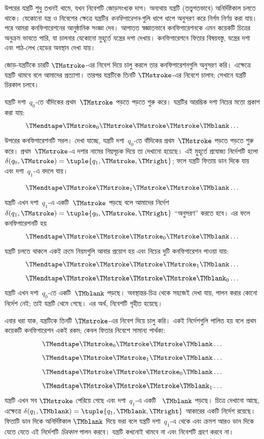 \documentclass[../../../include/open-logic-section]{subfiles}
\begin{document}
\begin{explain}
উপরের যন্ত্রটি শুধু তখনই থামে, যখন নিবেশটি জোড়সংখ্যক দাগ। অন্যথায়
যন্ত্রটি (তত্ত্বগতভাবে) অনির্দিষ্টকাল চলতে থাকে। যেকোনো যন্ত্র ও নিবেশের
ক্ষেত্রে যন্ত্রটির \emph{কনফিগারেশন}-গুলি ধাপে ধাপে অনুসরণ করে নির্গম
নির্ণয় করা যায়। পরে আমরা কনফিগারেশনের আনুষ্ঠানিক সংজ্ঞা দেব। আপাতত
স্বজ্ঞাতভাবে কনফিগারেশনকে এমন কয়েকটি চিত্রের অনুক্রম ভাবতে পারি, যা
চালনার যেকোনো মুহূর্তে যন্ত্রের দশা দেখায়। কনফিগারেশনে ফিতার বিষয়বস্তু,
যন্ত্রের দশা এবং পাঠ-লেখ হেডের অবস্থান দেখা যায়।

জোড়-যন্ত্রটিকে চারটি $\TMstroke$-এর নিবেশ দিয়ে চালু করলে তার
কনফিগারেশনগুলি অনুসরণ করি। এক্ষেত্রে যন্ত্রটি থামবে বলে আমাদের প্রত্যাশা।
তারপর যন্ত্রটিকে তিনটি $\TMstroke$-এর নিবেশে চালাব; সেখানে যন্ত্রটি
চিরকাল চলবে।

যন্ত্রটি দশা~$q_0$-তে বাঁদিকের প্রথম~$\TMstroke$ পড়তে পড়তে শুরু করে।
যন্ত্রটির আরম্ভিক দশা নিচের মতো প্রকাশ করা যায়:
\[
\TMendtape \TMstroke_0 \TMstroke \TMstroke \TMstroke \TMblank \ldots
\]
উপরের কনফিগারেশনটি সরল। দেখা যাচ্ছে, যন্ত্রটি দশা~$q_0$-তে বাঁদিকের
প্রথম~$\TMstroke$ পড়তে পড়তে শুরু করে। প্রথম~$\TMstroke$-এ দশার নামের
নিম্নসূচক দিয়ে তা দেখানো হয়েছে। এই মুহূর্তে প্রযোজ্য নির্দেশটি হলো
$\delta(q_0, \TMstroke) = \tuple{q_1, \TMstroke, \TMright}$; ফলে
যন্ত্রটি ফিতায় ডান দিকে যায় এবং দশা~$q_1$-এ বদলে যায়।

\[
\TMendtape \TMstroke \TMstroke_1 \TMstroke \TMstroke \TMblank \ldots
\]
যন্ত্রটি এখন দশা~$q_1$-এ একটি~$\TMstroke$ পড়ছে বলে আমাদের নির্দেশ
$\delta(q_1, \TMstroke) = \tuple{q_0, \TMstroke, \TMright}$ “অনুসরণ”
করতে হবে। এর ফলে কনফিগারেশনটি হয়
\[
\TMendtape \TMstroke \TMstroke \TMstroke_0 \TMstroke \TMblank \ldots
\]
যন্ত্রটি চলতে থাকলে একই ক্রমে নিয়মগুলি আবার প্রয়োগ হয় এবং নিচের দুটি
কনফিগারেশন পাওয়া যায়:
\[
\TMendtape \TMstroke \TMstroke \TMstroke \TMstroke_1 \TMblank \ldots
\]
\[
\TMendtape \TMstroke \TMstroke \TMstroke \TMstroke \TMblank_0 \ldots
\]
যন্ত্রটি এখন দশা~$q_0$-তে একটি~$\TMblank$ পড়ছে। অবস্থান্তর-চিত্র থেকে
সহজেই দেখা যায়, পালন করার কোনো নির্দেশ নেই; তাই যন্ত্রটি থেমে গেছে। এর
অর্থ, নিবেশটি গৃহীত হয়েছে।

এবার ধরা যাক, যন্ত্রটিকে তিনটি $\TMstroke$-এর নিবেশ দিয়ে চালু করি। একই
নির্দেশগুলি পালিত হয় বলে প্রথম কয়েকটি কনফিগারেশন একই রকম; কেবল ফিতার
নিবেশে সামান্য পার্থক্য:
\[
\TMendtape \TMstroke_0 \TMstroke \TMstroke \TMblank \ldots
\]
\[
\TMendtape \TMstroke \TMstroke_1 \TMstroke \TMblank \ldots
\]
\[
\TMendtape \TMstroke \TMstroke \TMstroke_0 \TMblank \ldots
\]
\[
\TMendtape \TMstroke \TMstroke \TMstroke \TMblank_1 \ldots
\]
যন্ত্রটি এখন সব $\TMstroke$ পেরিয়ে গেছে এবং দশা~$q_1$-এ একটি
~$\TMblank$ পড়ছে। চিত্রে দেখানো আছে, এক্ষেত্রে
$\delta(q_1, \TMblank) =\tuple{q_1, \TMblank, \TMright}$ আকারের একটি
নির্দেশ রয়েছে। ফিতাটি ডান দিকে অনির্দিষ্টকাল $\TMblank$ দিয়ে ভরা বলে
যন্ত্রটি দশা~$q_1$-এ থেকে এবং ক্রমশ আরও ডান দিকে যেতে যেতে এই নির্দেশটি
\emph{চিরকাল} পালন করবে। যন্ত্রটি কখনোই থামবে না এবং নিবেশটি গ্রহণ করবে
না।
\end{explain}
\end{document}
